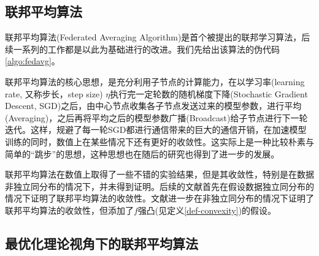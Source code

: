 \subsection{联邦平均算法}
\label{subsec:chap2-overview-fedavg}

联邦平均算法(Federated Averaging Algorithm)\cite{mcmahan2017fed_avg}是首个被提出的联邦学习算法，后续一系列的工作都是以此为基础进行的改进。我们先给出该算法的伪代码\ref{algo:fedavg}。



联邦平均算法的核心思想，是充分利用子节点的计算能力，在以学习率(learning rate, 又称步长，step size) $\eta$执行完一定轮数的随机梯度下降(Stochastic Gradient Descent, SGD)\cite{Robbins_1951_sgd}之后，由中心节点收集各子节点发送过来的模型参数，进行平均(Averaging)，之后再将平均之后的模型参数广播(Broadcast)给子节点进行下一轮迭代。这样，规避了每一轮SGD都进行通信带来的巨大的通信开销，在加速模型训练的同时，数值上在某些情况下还有更好的收敛性。这实际上是一种比较朴素与简单的``跳步''的思想，这种思想也在随后的研究\cite{zhang2020fedpd, proxskip, proxskip-vr}也得到了进一步的发展。

联邦平均算法在数值上取得了一些不错的实验结果\cite[Section 3]{mcmahan2017fed_avg}，但是其收敛性，特别是在数据非独立同分布的情况下，并未得到证明。后续的文献\parencite{zhou_2018_convergence}首先在假设数据独立同分布的情况下证明了联邦平均算法的收敛性。文献\parencite{li2019convergence}进一步在非独立同分布的情况下证明了联邦平均算法的收敛性，但添加了$f$强凸(见定义\ref{def-convexity})的假设。


\subsection{最优化理论视角下的联邦平均算法}
\label{subsec:chap2-overview-fedavg-opt}

